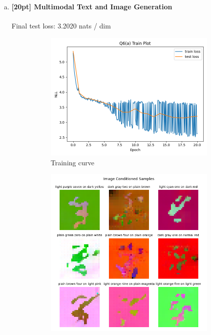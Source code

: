 \documentclass{article}
\begin{document}
\begin{enumerate}[(a)]
\item {\bf [20pt] Multimodal Text and Image Generation} \\\\
Final test loss: 3.2020 nats / dim
\begin{figure}[H]
    \centering
    \begin{subfigure}{0.45\textwidth}
        \centering
        \includegraphics[width=\textwidth]{figures/q6_a_train_plot.png}
        \caption{Training curve}
    \end{subfigure}
    \hspace{0.2in}
    \begin{subfigure}{0.45\textwidth}
        \centering
        \includegraphics[width=\textwidth]{figures/q6_a_samples_img_conditioned.png}

\end{subfigure}
\end{figure}
\end{enumerate}
\end{document}
